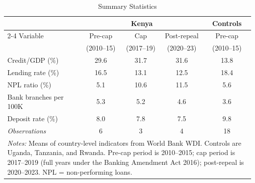 \begin{table}[htbp]
\centering
\caption{Summary Statistics}
\label{tab:summary}
\begin{tabular}{lcccc}
\hline\hline
 & \multicolumn{3}{c}{Kenya} & Controls \\
\cmidrule(lr){2-4}
 Variable & Pre-cap & Cap & Post-repeal & Pre-cap \\
 & (2010--15) & (2017--19) & (2020--23) & (2010--15) \\
\hline
  Credit/GDP (\%) & 29.6 & 31.7 & 31.6 & 13.8 \\
  Lending rate (\%) & 16.5 & 13.1 & 12.5 & 18.4 \\
  NPL ratio (\%) & 5.1 & 10.6 & 11.5 & 5.6 \\
  Bank branches per 100K & 5.3 & 5.2 & 4.6 & 3.6 \\
  Deposit rate (\%) & 8.0 & 7.8 & 7.5 & 9.8 \\
\hline
  \textit{Observations} & 6 & 3 & 4 & 18 \\
\hline\hline
\multicolumn{5}{p{0.9\textwidth}}{\footnotesize \textit{Notes:} Means of country-level indicators from World Bank WDI. Controls are Uganda, Tanzania, and Rwanda. Pre-cap period is 2010--2015; cap period is 2017--2019 (full years under the Banking Amendment Act 2016); post-repeal is 2020--2023. NPL = non-performing loans.}
\end{tabular}
\end{table}
